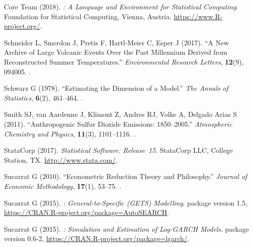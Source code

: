 \documentclass[article,nojss]{jss}
\begin{document}
\begin{thebibliography}{56}
	{ Core Team} (2018).
	\newblock \emph{: A Language and Environment for Statistical
		Computing}.
	\newblock {} Foundation for Statistical Computing, Vienna, Austria.
	\newblock \urlprefix\url{https://www.R-project.org/}.
	
	Schneider L, Smerdon J, Pretis F, Hartl-Meier C, Esper J (2017).
	\newblock \enquote{A New Archive of Large Volcanic Events Over the Past
		Millennium Derived from Reconstructed Summer Temperatures.}
	\newblock \emph{Environmental Research Letters}, \textbf{12}(9), 094005.
	\newblock {}.
	
	Schwarz G (1978).
	\newblock \enquote{Estimating the Dimension of a Model.}
	\newblock \emph{The Annals of Statistics}, \textbf{6}(2), 461--464.
	\newblock {}.
	
	Smith SJ, {van Aardenne} J, Klimont Z, Andres RJ, Volke A, {Delgado Arias} S
	(2011).
	\newblock \enquote{Anthropogenic Sulfur Dioxide Emissions: 1850--2005.}
	\newblock \emph{Atmospheric Chemistry and Physics}, \textbf{11}(3), 1101--1116.
	\newblock {}.
	
	{StataCorp} (2017).
	\newblock \emph{ Statistical Software: Release~15}.
	\newblock StataCorp LLC, College Station, TX.
	\newblock \urlprefix\url{http://www.stata.com/}.
	
	Sucarrat G (2010).
	\newblock \enquote{Econometric Reduction Theory and Philosophy.}
	\newblock \emph{Journal of Economic Methodology}, \textbf{17}(1), 53--75.
	\newblock {}.
	
	Sucarrat G (2015{}).
	\newblock \emph{: General-to-Specific (GETS) Modelling}.
	\newblock {} package version 1.5,
	\urlprefix\url{https://CRAN.R-project.org/package=AutoSEARCH}.
	
	Sucarrat G (2015{}).
	\newblock \emph{: Simulation and Estimation of Log-GARCH Models}.
	\newblock {} package version 0.6-2,
	\urlprefix\url{https://CRAN.R-project.org/package=lgarch/}.
	

\end{thebibliography}
\end{document}
